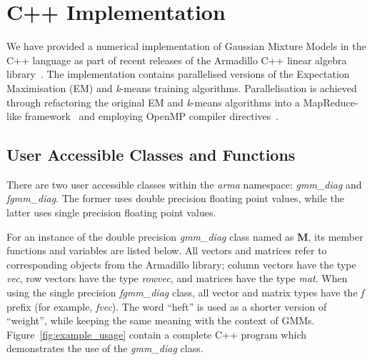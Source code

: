 \section{C++ Implementation}

We have provided a numerical implementation of Gaussian Mixture Models in the C++ language
as part of recent releases of the Armadillo C++ linear algebra library~\cite{Armadillo_JOSS_2016}.
The implementation contains parallelised versions of the Expectation Maximisation (EM) and {\it k}-means training algorithms.
Parallelisation is achieved through refactoring the original EM and {\it k}-means algorithms
into a MapReduce-like framework~\cite{TODO} and employing OpenMP compiler directives~\cite{TODO}.

\subsection{User Accessible Classes and Functions}

There are two user accessible classes within the {\it arma} namespace:
{\it gmm\_diag} and {\it fgmm\_diag}.
The former uses double precision floating point values, while the latter uses single precision floating point values.

For an instance of the double precision {\it gmm\_diag} class named as {\bf M},
its member functions and variables are listed below.
All vectors and matrices refer to corresponding objects from the Armadillo library;
column vectors have the type {\it vec}, row vectors have the type {\it rowvec}, and matrices have the type {\it mat}.
When using the single precision {\it fgmm\_diag} class, all vector and matrix types have the {\it f} prefix (for example, {\it fvec}).
The word ``heft'' is used as a shorter version of ``weight'', while keeping the same meaning with the context of GMMs.
Figure~\ref{fig:example_usage} contain a complete C++ program which demonstrates the use of the {\it gmm\_diag} class.


